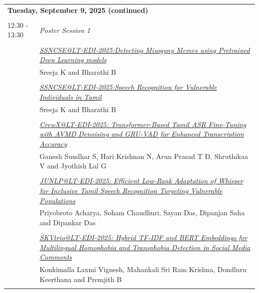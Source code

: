 \documentclass[11pt,oneside]{book}
\begin{document}
      
    \begin{tabular}{p{24mm}p{124mm}}
    \multicolumn{2}{l}{\bf Tuesday, September 9, 2025 (continued)} \\\\
                  12:30 - 13:30 & \emph{Poster Session 1}\\\\
      
                
                      & \hyperlink{page.1}{\emph{SSNCSE@LT-EDI-2025:Detecting Misogyny Memes using Pretrained Deep Learning models}}\\
        & Sreeja K\index{K} and Bharathi B\index{B}\\\\
                
                      & \hyperlink{page.6}{\emph{SSNCSE@LT-EDI-2025:Speech Recognition for Vulnerable Individuals in Tamil}}\\
        & Sreeja K\index{K} and Bharathi B\index{B}\\\\
                
                      & \hyperlink{page.11}{\emph{CrewX@LT-EDI-2025: Transformer-Based Tamil ASR Fine-Tuning with AVMD Denoising and GRU-VAD for Enhanced Transcription Accuracy}}\\
        & Ganesh Sundhar S\index{S}, Hari Krishnan N\index{N}, Arun Prasad T D\index{D}, Shruthikaa V\index{V} and Jyothish Lal G\index{G}\\\\
                
                      & \hyperlink{page.17}{\emph{JUNLP@LT-EDI-2025: Efficient Low-Rank Adaptation of Whisper for Inclusive Tamil Speech Recognition Targeting Vulnerable Populations}}\\
        & Priyobroto Acharya\index{Acharya}, Soham Chaudhuri\index{Chaudhuri}, Sayan Das\index{Das}, Dipanjan Saha\index{Saha} and Dipankar Das\index{Das}\\\\
                
                      & \hyperlink{page.26}{\emph{SKVtrio@LT-EDI-2025: Hybrid TF-IDF and BERT Embeddings for  Multilingual Homophobia and Transphobia Detection in Social Media  Comments}}\\
        & Konkimalla Laxmi Vignesh\index{Vignesh}, Mahankali Sri Ram Krishna\index{Krishna}, Dondluru Keerthana\index{Keerthana} and Premjith B\index{B}\\\\
                

\end{tabular}
\end{document}
